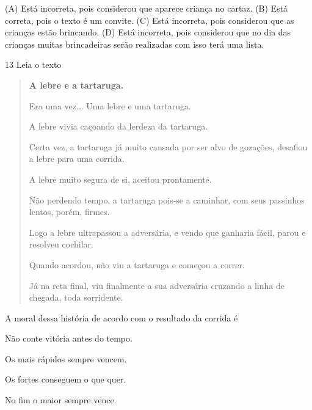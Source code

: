 
(A) Está incorreta, pois considerou que aparece criança no cartaz.
(B) Está correta, pois o texto é um convite.
(C) Está incorreta, pois considerou que as crianças estão brincando.
(D) Está incorreta, pois considerou que no dia das crianças muitas
brincadeiras serão realizadas com isso terá uma lista.

\num{13} Leia o texto

\begin{quote}
\textbf{A lebre e a tartaruga.}

Era uma vez... Uma lebre e uma tartaruga.

A lebre vivia caçoando da lerdeza da tartaruga.

Certa vez, a tartaruga já muito cansada por ser alvo de gozações,
desafiou a lebre para uma corrida.

A lebre muito segura de si, aceitou prontamente.

Não perdendo tempo, a tartaruga pois-se a caminhar, com seus passinhos
lentos, porém, firmes.

Logo a lebre ultrapassou a adversária, e vendo que ganharia fácil, parou
e resolveu cochilar.

Quando acordou, não viu a tartaruga e começou a correr.

Já na reta final, viu finalmente a sua adversária cruzando a linha de
chegada, toda sorridente.
\end{quote}


A moral dessa história de acordo com o resultado da corrida é

\begin{escolha}
\item Não conte vitória antes do tempo.

\item Os mais rápidos sempre vencem.

\item Os fortes conseguem o que quer.

\item No fim o maior sempre vence.
\end{escolha}

